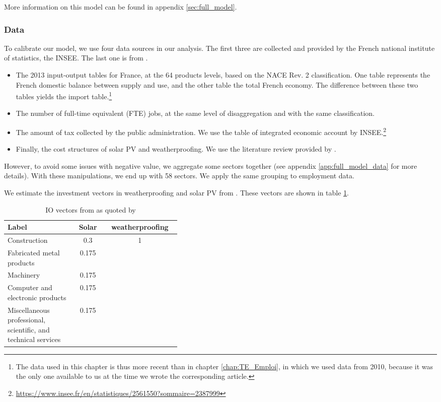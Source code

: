 More information on this model can be found in appendix \ref{sec:full_model}.

\subsubsection{Data}
To calibrate our model, we use four data sources in our analysis. The first three are collected and provided by the French national institute of statistics, the INSEE. The last one is from \citet{Garrett2017}.
\begin{itemize}
	\item The 2013 input-output tables for France, at the 64 products levels, based on the NACE Rev. 2 classification. One table represents the French domestic balance between supply and use, and the other table the total French economy. The difference between these two tables yields the import table.\footnote{The data used in this chapter is thus more recent than in chapter \ref{chap:TE_Emploi}, in which we used data from 2010, because it was the only one available to us at the time we wrote the corresponding article.}
	\item The number of full-time equivalent (FTE) jobs, at the same level of disaggregation and with the same classification.
	\item The amount of tax collected by the public administration. We use the table of integrated economic account by INSEE.\footnote{\url{https://www.insee.fr/en/statistiques/2561550?sommaire=2387999}}
	\item Finally, the cost structures of solar PV and weatherproofing. We use the literature review provided by \citet{Garrett2017}.
\end{itemize}

However, to avoid some issues with negative value, we aggregate some sectors together (see appendix \ref{app:full_model_data} for more details). With these manipulations, we end up with 58 sectors. We apply the same grouping to employment data.

We estimate the investment vectors in weatherproofing and solar PV from \citet{Pollin2015}. These vectors are shown in table \ref{tab:IO_vectors}.

\begin{table}[!h]
	\centering
	\caption{IO vectors from \citet{Pollin2015} as quoted by \citet{Garrett2017}}
	\label{tab:IO_vectors}
	\begin{tabular}{p{0.4\linewidth}cc}
		\toprule
		Label  & Solar & weatherproofing \\
		\midrule
		Construction& 0.3 & 1 \\
		Fabricated metal products& 0.175 &  \\
		Machinery& 0.175 &  \\
		Computer and electronic products& 0.175 &   \\
		Miscellaneous professional, scientific, and technical services& 0.175 &   \\
		\bottomrule
	\end{tabular}
\end{table}


